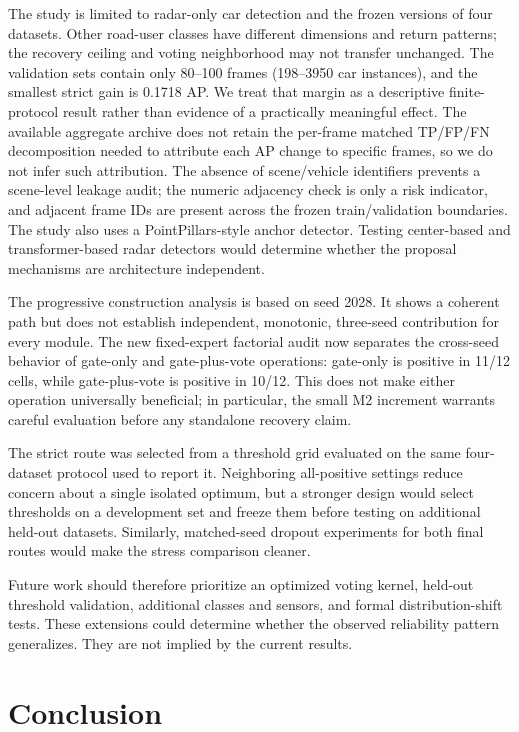 \documentclass[preprint,12pt,times]{elsarticle}
\begin{document}
The study is limited to radar-only car detection and the frozen versions of
four datasets. Other road-user classes have different dimensions and return
patterns; the recovery ceiling and voting neighborhood may not transfer
unchanged. The validation sets contain only 80--100 frames (198--3950 car
instances), and the smallest strict gain is 0.1718 AP. We treat that margin as
a descriptive finite-protocol result rather than evidence of a practically
meaningful effect. The available aggregate archive does not retain the
per-frame matched TP/FP/FN decomposition needed to attribute each AP change to
specific frames, so we do not infer such attribution. The absence of
scene/vehicle identifiers prevents a scene-level leakage audit; the numeric
adjacency check is only a risk indicator, and adjacent frame IDs are present
across the frozen train/validation boundaries. The study also uses a PointPillars-style anchor detector. Testing
center-based and transformer-based radar detectors would determine whether the
proposal mechanisms are architecture independent.

The progressive construction analysis is based on seed 2028. It shows a coherent
path but does not establish independent, monotonic, three-seed contribution
for every module. The new fixed-expert factorial audit now separates the
cross-seed behavior of gate-only and gate-plus-vote operations: gate-only is
positive in 11/12 cells, while gate-plus-vote is positive in 10/12. This does
not make either operation universally beneficial; in particular, the small M2
increment warrants careful evaluation before any standalone recovery claim.

The strict route was selected from a threshold grid evaluated on the same
four-dataset protocol used to report it. Neighboring all-positive settings
reduce concern about a single isolated optimum, but a stronger design would
select thresholds on a development set and freeze them before testing on
additional held-out datasets. Similarly, matched-seed dropout experiments for
both final routes would make the stress comparison cleaner.

Future work should therefore prioritize an optimized voting kernel, held-out
threshold validation, additional classes and sensors, and formal
distribution-shift tests. These extensions could determine whether the
observed reliability pattern generalizes. They are not implied by the current
results.

\section{Conclusion}
\end{document}
